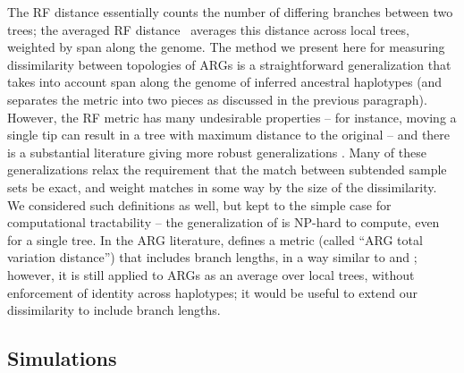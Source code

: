 \documentclass[10pt,twoside,lineno]{gsajnl}
\begin{document}
The RF distance \citep{robinson1981comparison}
essentially counts the number of differing branches between two trees;
the averaged RF distance~\citep{kuhner2015assessing}
averages this distance across local trees, weighted by span along the genome.
The method we present here for measuring dissimilarity between topologies of ARGs
is a straightforward generalization
that takes into account span along the genome of inferred ancestral haplotypes
(and separates the metric into two pieces as discussed in the previous paragraph).
However, the RF metric has many undesirable properties --
for instance, moving a single tip can result in a tree with maximum distance to the original --
and there is a substantial literature giving more robust generalizations
\citep[reviewed by][]{llabres2021generalized}.
Many of these generalizations \citep[e.g.,][]{bocker2013generalized}
relax the requirement that the match between subtended sample sets be exact,
and weight matches in some way by the size of the dissimilarity.
We considered such definitions as well, but kept to the simple case
for computational tractability --
the generalization of \citet{bocker2013generalized} is NP-hard to compute, even for a single tree.
In the ARG literature, \citet{zhang2023biobankscale}
defines a metric (called ``ARG total variation distance'') that includes branch lengths,
in a way similar to \citet{robinson1979comparison} and \citet{kuhner1994simulation};
however, it is still applied to ARGs as an average over local trees,
without enforcement of identity across haplotypes;
it would be useful to extend our dissimilarity to include branch lengths.

\subsection{Simulations}
\end{document}
